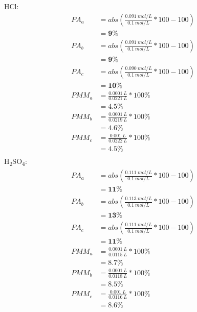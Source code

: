 \documentclass[10pt,twoside]{report}
\begin{document}
\begin{multicols}{2}
    HCl:\\
    \begin{equation*}
        \begin{split}
            PA_a &= abs(\frac{0.091\ mol/L}{0.1\ mol/L}*100-100)\\
                &= \mathbf{9\%} \\
            PA_b &= abs(\frac{0.091\ mol/L}{0.1\ mol/L}*100-100)\\
                &= \mathbf{9\%} \\
            PA_c &= abs(\frac{0.090\ mol/L}{0.1\ mol/L}*100-100)\\
                &= \mathbf{10\%} \\
            PMM_a &= \frac{0.0001\ L}{0.0221\ L}*100\%\\
                &= \mathbf{4.5\%}\\
            PMM_b &= \frac{0.0001\ L}{0.0219\ L}*100\%\\
                &= \mathbf{4.6\%}\\
            PMM_c &= \frac{0.001\ L}{0.0222\ L}*100\%\\
                &= \mathbf{4.5\%}\\
        \end{split}
    \end{equation*}
\break
    H\textsubscript{2}SO\textsubscript{4}:\\
    \begin{equation*}
        \begin{split}
            PA_a &= abs(\frac{0.111\ mol/L}{0.1\ mol/L}*100-100)\\
                &= \mathbf{11\%} \\
            PA_b &= abs(\frac{0.113\ mol/L}{0.1\ mol/L}*100-100)\\
                &= \mathbf{13\%} \\
            PA_c &= abs(\frac{0.111\ mol/L}{0.1\ mol/L}*100-100)\\
                &= \mathbf{11\%} \\
            PMM_a &= \frac{0.0001\ L}{0.0115\ L}*100\%\\
                &= \mathbf{8.7\%}\\
            PMM_b &= \frac{0.0001\ L}{0.0118\ L}*100\%\\
                &= \mathbf{8.5\%}\\
            PMM_c &= \frac{0.001\ L}{0.0116\ L}*100\%\\
                &= \mathbf{8.6\%}\\
        \end{split}
    \end{equation*}
\end{multicols}
\end{document}

